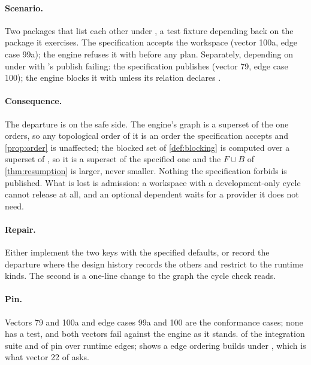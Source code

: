 \paragraph{Scenario.} Two packages that list each other under
, a test fixture depending back on the package it
exercises. The specification accepts the workspace (vector 100a, edge case
99a); the engine refuses it with  before any plan. Separately,
 depending on  under 
with 's publish failing: the specification publishes
 (vector 79, edge case 100); the engine blocks it with
 unless its relation declares .

\paragraph{Consequence.} The departure is on the safe side. The engine's
graph is a superset of the one  orders, so any topological order
of it is an order the specification accepts and \cref{prop:order} is
unaffected; the blocked set of \cref{def:blocking} is computed over a
superset of , so it is a superset of the specified one
and the $F \cup B$ of \cref{thm:resumption} is larger, never smaller.
Nothing the specification forbids is published. What is lost is admission: a
workspace with a development-only cycle cannot release at all, and an
optional dependent waits for a provider it does not need.

\paragraph{Repair.} Either implement the two keys with the specified
defaults, or record the departure where the design history records the
others and restrict  to the runtime kinds. The second is a
one-line change to the graph the cycle check reads.

\paragraph{Pin.} Vectors 79 and 100a and edge cases 99a and 100 are the
conformance cases; none has a test, and both vectors fail against the engine
as it stands.  of the integration suite and
 of  pin  over
runtime edges;  shows a
 edge ordering builds under , which is what
vector 22 of  asks.

